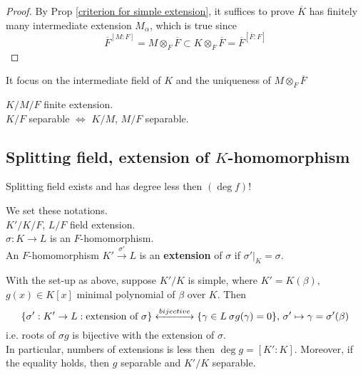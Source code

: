 \begin{proof}
    By Prop \ref{criterion for simple extension}, it suffices to prove  $ \overline{K} $ has finitely many intermediate extension  $ M_\alpha $, which is true since
    \[\overline{F}^{[M:F]}=M\otimes_F\overline{F}\subset K\otimes_F\overline{F}=\overline{F}^{[\overline{F}:F]}\]
\end{proof}
\begin{remark}
    It focus on the intermediate field of  $ K  $ and the uniqueness of  $ M\otimes_F\overline{F} $ 
\end{remark}
\begin{corollary}
     $ K/M/F $ finite extension.\\
      $ K/F $ separable  $ \Leftrightarrow $  $ K/M $,  $ M/F $ separable.   
\end{corollary}
\subsection{Splitting field, extension of  $ K  $-homomorphism}
\begin{note}
    Splitting field exists and has degree less then  $ (\deg f)! $ 
\end{note}
We set these notations.\\
 $ K'/K/F $,  $ L/F $ field extension.\\
  $ \sigma:K\rightarrow L $ is an  $ F $-homomorphism.\\
  An  $ F $-homomorphism  $ K'\xrightarrow{\sigma'}L $ is an \textbf{extension} of  $ \sigma  $ if  $ \sigma'|_K=\sigma $.
  \begin{proposition}
    With the set-up as above, suppose  $ K'/K  $ is simple, where  $ K'=K(\beta) $,  $ g(x)\in K[x] $ minimal polynomial of  $ \beta  $ over  $ K  $. Then 
    \[\{\sigma':K'\rightarrow L:\text{extension of }\sigma \}\xleftrightarrow{bijective}\{\gamma\in L\:\sigma g(\gamma)=0\},\,\sigma'\mapsto \gamma=\sigma'(\beta)\] 
    i.e. roots of  $ \sigma  g $ is bijective with the extension of  $ \sigma $.\\
    In particular, numbers of extensions is less then  $ \deg g=[K':K] $. Moreover, if the equality holds, then  $ g  $ separable and  $ K'/K  $ separable.
  \end{proposition} 
